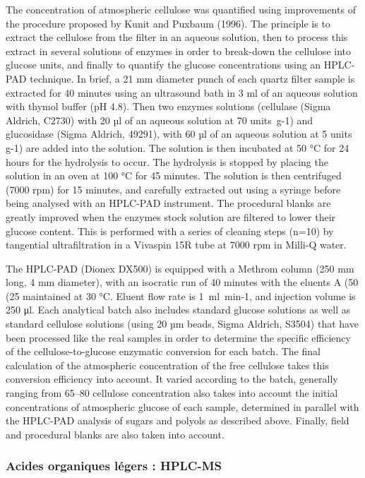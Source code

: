 The concentration of atmospheric cellulose was quantified using improvements of the
procedure proposed by Kunit and Puxbaum (1996). The principle is to extract the cellulose
from the filter in an aqueous solution, then to process this extract in several solutions
of enzymes in order to break-down the cellulose into glucose units, and finally to
quantify the glucose concentrations using an HPLC-PAD technique. In brief, a 21 mm
diameter punch of each quartz filter sample is extracted for 40 minutes using an
ultrasound bath in 3 ml of an aqueous solution with thymol buffer (pH 4.8). Then two
enzymes solutions (cellulase (Sigma Aldrich, C2730) with 20 µl of an aqueous solution at
70 units g-1) and glucosidase (Sigma Aldrich, 49291), with 60 µl of an aqueous solution at
5 units g-1) are added into the solution. The solution is then incubated at 50 °C for 24
hours for the hydrolysis to occur. The hydrolysis is stopped by placing the solution in an
oven at 100 °C for 45 minutes. The solution is then centrifuged (7000 rpm) for 15 minutes,
and carefully extracted out using a syringe before being analysed with an HPLC-PAD
instrument. The procedural blanks are greatly improved when the enzymes stock solution are
filtered to lower their glucose content. This is performed with a series of cleaning steps
(n=10) by tangential ultrafiltration in a Vivaspin 15R tube at 7000 rpm in Milli-Q water.

The HPLC-PAD (Dionex DX500) is equipped with a Methrom column (250 mm long, 4 mm
diameter), with an isocratic run of 40 minutes with the eluents A (50%
(25%
maintained at 30 °C. Eluent flow rate is 1 ml min-1, and injection volume is 250 μl. Each
analytical batch also includes standard glucose solutions as well as standard cellulose
solutions (using 20 µm beads, Sigma Aldrich, S3504) that have been processed like the real
samples in order to determine the specific efficiency of the cellulose-to-glucose
enzymatic conversion for each batch. The final calculation of the atmospheric
concentration of the free cellulose takes this conversion efficiency into account. It
varied according to the batch, generally ranging from 65–80%
cellulose concentration also takes into account the initial concentrations of atmospheric
glucose of each sample, determined in parallel with the HPLC-PAD analysis of sugars and
polyols as described above. Finally, field and procedural blanks are also taken into
account.
\subsubsection{Acides organiques légers : HPLC-MS}%
\label{ssub:acides_organiques_légers_hplc_ms}


